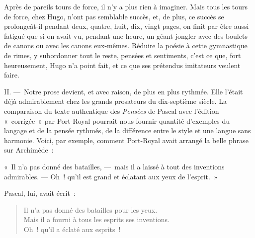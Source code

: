\documentclass[french,twoside]{book} %
\newenvironment{quoteblock}%
  {\begin{quoting}}
  {\end{quoting}}
\newenvironment{quotebar}{%
    \def\FrameCommand{{\color{rubric!10!}\vrule width 0.5em} \hspace{0.9em}}%
    \def\OuterFrameSep{\itemsep} %
    \MakeFramed {\advance\hsize-\width \FrameRestore}
  }%
  {%
    \endMakeFramed
  }
\renewenvironment{quoteblock}%
  {%
    \savenotes
    \setstretch{0.9}
    \normalfont
    \begin{quotebar}
  }
  {%
    \end{quotebar}
    \spewnotes
  }
\begin{document}
\noindent Après de pareils tours de force, il n’y a plus rien à imaginer. Mais tous les tours de force, chez Hugo, n’ont pas semblable succès, et, de plus, ce succès se prolongeât-il pendant deux, quatre, huit, dix, vingt pages, on finit par être aussi fatigué que si on avait vu, pendant une heure, un géant jongler avec des boulets de canons ou avec les canons eux-mêmes. Réduire la poésie à cette gymnastique de rimes, y subordonner tout le reste, pensées et sentiments, c’est ce que, fort heureusement, Hugo n’a point fait, et ce que ses prétendus imitateurs veulent faire.\par
\par
II. — Notre prose devient, et avec raison, de plus en plus rythmée. Elle l’était déjà admirablement chez les grands prosateurs du dix-septième siècle. La comparaison du texte authentique des \emph{Pensées} de Pascal avec l’édition « corrigée » par Port-Royal pourrait nous fournir quantité d’exemples du langage et de la pensée rythmés, de la différence entre le style et une langue sans harmonie. Voici, par exemple, comment Port-Royal avait arrangé la belle phrase sur Archimède :\par

\begin{quoteblock}
 \noindent « Il n’a pas donné des batailles, — mais il a laissé à tout des inventions admirables. — Oh ! qu’il est grand et éclatant aux yeux de l’esprit. »
 \end{quoteblock}

\noindent Pascal, lui, avait écrit :\par


\begin{verse}
Il n’a pas donné des batailles pour les yeux.\\
Mais il a fourni à tous les esprits ses inventions.\\
Oh ! qu’il a éclaté aux esprits !\\
\end{verse}
\end{document}
